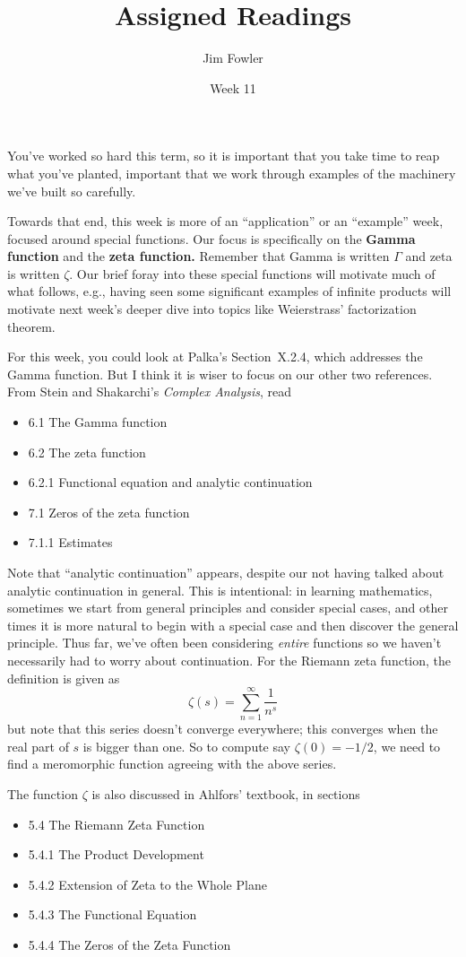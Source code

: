\documentclass{homework}
\author{Jim Fowler}
\title{Assigned Readings}
\date{Week 11}
\begin{document}
\maketitle

You've worked so hard this term, so it is important that you take time
to reap what you've planted, important that we work through examples
of the machinery we've built so carefully.

Towards that end, this week is more of an ``application'' or an
``example'' week, focused around special functions.  Our focus is
specifically on the \textbf{Gamma function} and the \textbf{zeta
  function.}  Remember that Gamma is written $\Gamma$ and zeta is
written $\zeta$.  Our brief foray into these special functions will
motivate much of what follows, e.g., having seen some significant
examples of infinite products will motivate next week's deeper dive
into topics like Weierstrass' factorization theorem.

For this week, you could look at Palka's Section~X.2.4, which
addresses the Gamma function.  But I think it is wiser to focus on our
other two references.  From Stein and Shakarchi's \textit{Complex
  Analysis}, read
\begin{itemize}
\item 6.1 The Gamma function  
\item 6.2 The zeta function
\item 6.2.1 Functional equation and analytic continuation
\item 7.1 Zeros of the zeta function
\item 7.1.1 Estimates
\end{itemize}
Note that ``analytic continuation'' appears, despite our not having
talked about analytic continuation in general.  This is intentional:
in learning mathematics, sometimes we start from general principles
and consider special cases, and other times it is more natural to
begin with a special case and then discover the general principle.
Thus far, we've often been considering \textit{entire} functions so we
haven't necessarily had to worry about continuation.  For the Riemann
zeta function, the definition is given as
\[
  \zeta (s)=\sum_{n=1}^\infty \frac {1}{n^{s}}
\]
but note that this series doesn't converge everywhere; this converges
when the real part of $s$ is bigger than one.  So to compute say
$\zeta(0) = -1/2$, we need to find a meromorphic function agreeing
with the above series.

The function $\zeta$ is also discussed in Ahlfors' textbook, in
sections
\begin{itemize}
\item 5.4 The Riemann Zeta Function
\item 5.4.1 The Product Development
\item 5.4.2 Extension of Zeta to the Whole Plane
\item 5.4.3 The Functional Equation
\item 5.4.4 The Zeros of the Zeta Function
\end{itemize}
\end{document}
